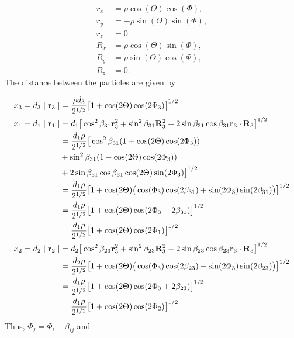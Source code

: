 \documentclass{article}
\numberwithin{equation}{section}
\numberwithin{figure}{section}
\begin{document}
\begin{subequations}
	\begin{align*}
	r_x &= \rho \cos(\Theta)\cos(\Phi),\\
	r_y &= -\rho \sin(\Theta)\sin(\Phi),\\
	r_z &= 0\\
	R_x &= \rho \cos(\Theta)\sin(\Phi),\\
	R_y &= \rho \sin(\Theta)\cos(\Phi),\\
	R_z &= 0.
	\end{align*}   
\end{subequations}
The distance between the particles are given by

\begin{align}
x_3 = d_3 \mid\mathbf{r}_{3}\mid &= \frac{\rho d_3}{2^{1/2}}\big[1+\cos(2\Theta)\cos(2\Phi_3)\big]^{1/2}\\
x_1 = d_1 \mid\mathbf{r}_{1}\mid &= d_1 \big[\cos^2\beta_{31}\mathbf{r}^2_{3} + \sin^2\beta_{31}\mathbf{R}^2_3 + 2\sin\beta_{31}\cos\beta_{31}\mathbf{r}_3\cdot\mathbf{R}_3\big]^{1/2}\\ \notag
&= \frac{d_1\rho}{2^{1/2}} \big[\cos^2\beta_{31}(1 + \cos(2\Theta)\cos(2\Phi_3))\\ \notag
&+ \sin^2\beta_{31}(1 - \cos(2\Theta)\cos(2\Phi_3))\\ \notag
&+ 2\sin\beta_{31}\cos\beta_{31}\cos(2\Theta)\sin(2\Phi_3)\big]^{1/2}\\ \notag
&= \frac{d_1\rho}{2^{1/2}} \big[1 + \cos(2\Theta)\big(\cos(\Phi_3)\cos(2\beta_{31}) + \sin(2\Phi_3)\sin(2\beta_{31})\big)\big]^{1/2}\\ \notag
&= \frac{d_1\rho}{2^{1/2}}\big[1 + \cos(2\Theta)\cos(2\Phi_3 - 2\beta_{31})\big]^{1/2}\\ \notag
&= \frac{d_1\rho}{2^{1/2}}\big[1 + \cos(2\Theta)\cos(2\Phi_1)\big]^{1/2}\\ \notag
x_2 = d_2 \mid\mathbf{r}_{2}\mid
&= d_2 \big[\cos^2\beta_{23}\mathbf{r}^2_{3} + \sin^2\beta_{23}\mathbf{R}^2_3 - 2\sin\beta_{23}\cos\beta_{23}\mathbf{r}_3\cdot\mathbf{R}_3\big]^{1/2}\\ \notag
&= \frac{d_2\rho}{2^{1/2}} \big[1 + \cos(2\Theta)\big(\cos(\Phi_3)\cos(2\beta_{23}) - \sin(2\Phi_3)\sin(2\beta_{23})\big)\big]^{1/2}\\ \notag
&= \frac{d_1\rho}{2^{1/2}}\big[1 + \cos(2\Theta)\cos(2\Phi_3 + 2\beta_{23})\big]^{1/2}\\ \notag
&= \frac{d_1\rho}{2^{1/2}}\big[1 + \cos(2\Theta)\cos(2\Phi_2)\big]^{1/2}
\end{align}
Thus, $\Phi_j = \Phi_i-\beta_{ij}$ and
\end{document}
